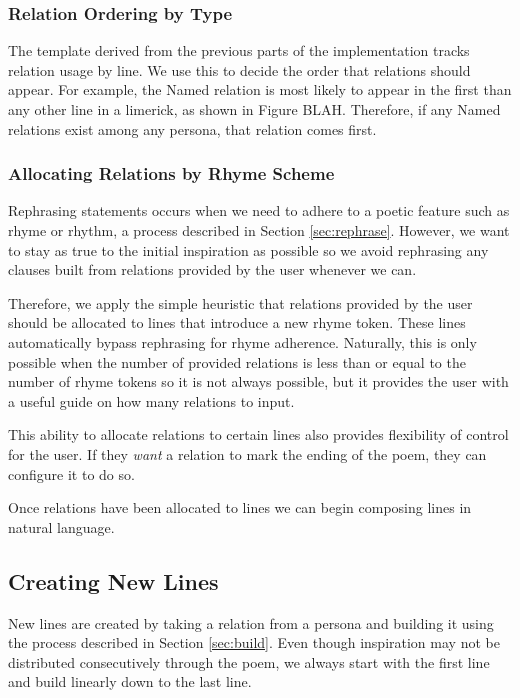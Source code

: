 \subsubsection{Relation Ordering by Type}

The template derived from the previous parts of the implementation tracks relation usage by line. We use this to decide the order that relations should appear. For example, the Named relation is most likely to appear in the first than any other line in a limerick, as shown in Figure BLAH. Therefore, if any Named relations exist among any persona, that relation comes first.

\subsubsection{Allocating Relations by Rhyme Scheme}

Rephrasing statements occurs when we need to adhere to a poetic feature such as rhyme or rhythm, a process described in Section \ref{sec:rephrase}. However, we want to stay as true to the initial inspiration as possible so we avoid rephrasing any clauses built from relations provided by the user whenever we can.

Therefore, we apply the simple heuristic that relations provided by the user should be allocated to lines that introduce a new rhyme token. These lines automatically bypass rephrasing for rhyme adherence. Naturally, this is only possible when the number of provided relations is less than or equal to the number of rhyme tokens so it is not always possible, but it provides the user with a useful guide on how many relations to input.

This ability to allocate relations to certain lines also provides flexibility of control for the user. If they \textit{want} a relation to mark the ending of the poem, they can configure it to do so.

Once relations have been allocated to lines we can begin composing lines in natural language.

\subsection{Creating New Lines}
\label{sec:new-lines}
New lines are created by taking a relation from a persona and building it using the process described in Section \ref{sec:build}. Even though inspiration may not be distributed consecutively through the poem, we always start with the first line and build linearly down to the last line.

